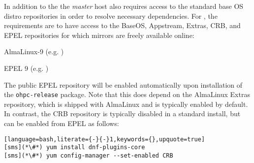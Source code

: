 In addition to the \OHPC{}
\iftoggle{isxCAT}{and \xCAT{} package repositories,}{package repository,}
the {\em master} host also requires access to the standard base OS distro
repositories in order to resolve necessary dependencies. For \baseOS{}, the
requirements are to have access to the BaseOS, Appstream, Extras, CRB,
and EPEL repositories for which mirrors are freely available online:

\begin{itemize*}
\item AlmaLinux-9
  (e.g. \href{https://repo.almalinux.org/almalinux/9/}
             {\color{blue}{https://repo.almalinux.org/almalinux/9/}} )
\item EPEL 9 (e.g. \href{http://download.fedoraproject.org/pub/epel/9/}
                        {\color{blue}{http://download.fedoraproject.org/pub/epel/9/}} )
\end{itemize*}

\noindent The public EPEL repository will be enabled automatically upon
installation of the \texttt{ohpc-release} package. Note that this does depend
on the AlmaLinux Extras repository, which is shipped with AlmaLinux and is typically
enabled by default.  In contrast, the CRB repository is typically
disabled in a standard install, but can be enabled from EPEL as follows:

\begin{lstlisting}[language=bash,literate={-}{-}1,keywords={},upquote=true]
[sms](*\#*) yum install dnf-plugins-core
[sms](*\#*) yum config-manager --set-enabled CRB
\end{lstlisting}
